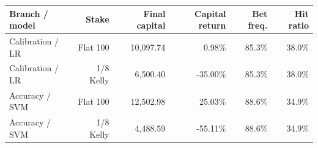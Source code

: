\begin{tabularx}{\linewidth}{@{}Yrrrrr@{}}
\toprule
Branch / model & Stake & Final capital & Capital return & Bet freq. & Hit ratio \\

\midrule
Calibration / LR & Flat 100 & 10,097.74 & 0.98\% & 85.3\% & 38.0\% \\
Calibration / LR & 1/8 Kelly & 6,500.40 & -35.00\% & 85.3\% & 38.0\% \\
Accuracy / SVM & Flat 100 & 12,502.98 & 25.03\% & 88.6\% & 34.9\% \\
Accuracy / SVM & 1/8 Kelly & 4,488.59 & -55.11\% & 88.6\% & 34.9\% \\
\bottomrule
\end{tabularx}
